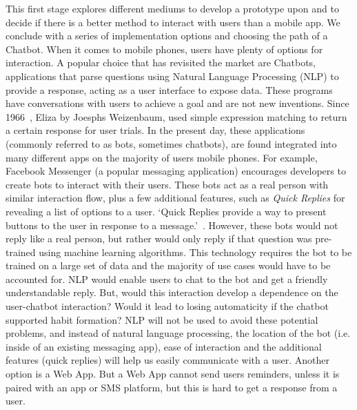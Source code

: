 This first stage explores different mediums to develop a prototype upon and to decide if there is a better method to interact with users than a mobile app. We conclude with a series of implementation options and choosing the path of a Chatbot.\newline
\newline
When it comes to mobile phones, users have plenty of options for interaction. A popular choice that has revisited the market are Chatbots, applications that parse questions using Natural Language Processing (NLP) to provide a response, acting as a user interface to expose data. These programs have conversations with users to achieve a goal and are not new inventions. Since 1966~\cite{article_eliza}, Eliza by Joesphs Weizenbaum, used simple expression matching to return a certain response for user trials. In the present day, these applications (commonly referred to as bots, sometimes chatbots), are found integrated into many different apps on the majority of users mobile phones. For example, Facebook Messenger (a popular messaging application) encourages developers to create bots to interact with their users. These bots act as a real person with similar interaction flow, plus a few additional features, such as \textit{Quick Replies} for revealing a list of options to a user. `Quick Replies provide a way to present buttons to the user in response to a message.'~\cite{doc_fb_quick_replies}. However, these bots would not reply like a real person, but rather would only reply if that question was pre-trained using machine learning algorithms. This technology requires the bot to be trained on a large set of data and the majority of use cases would have to be accounted for.\newline
\newline
NLP would enable users to chat to the bot and get a friendly understandable reply. But, would this interaction develop a dependence on the user-chatbot interaction? Would it lead to losing automaticity if the chatbot supported habit formation? NLP will not be used to avoid these potential problems, and instead of natural language processing, the location of the bot (i.e. inside of an existing messaging app), ease of interaction and the additional features (quick replies) will help us easily communicate with a user.\newline
\newline
Another option is a Web App. But a Web App cannot send users reminders, unless it is paired with an app or SMS platform, but this is hard to get a response from a user.\newline
